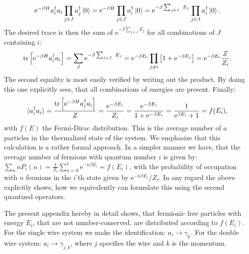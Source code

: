 \begin{equation}
\text{e}^{-\beta H} a^\dagger_i a_i\prod_{j\in J} a^\dagger_j \ket{0} = \text{e}^{-\beta H}\prod_{j\in J} a^\dagger_i \ket{0} = \text{e}^{-\beta \sum_{j \in J} E_j} \prod_{j \in J} a^\dagger_i \ket{0}. \nonumber
\end{equation}
The desired trace is then the sum of $\text{e}^{-\beta \sum_{j \in J} E_j}$ for all combinations of $J$ containing $i$:
\begin{equation}
\tr\left[\text{e}^{-\beta H}a^\dagger_ia_i\right] = \sum_J \text{e}^{-\beta \sum_{j \in J} E_j} = \text{e}^{-\beta E_i}\prod_{j \neq i} \left[1 + \text{e}^{-\beta E_j}\right] = \text{e}^{-\beta E_i} \frac{Z}{Z_i}. \nonumber 
\end{equation}
The second equality is most easily verified by writing out the product. By doing this one explicitly sees, that all combinations of energies are present. Finally: 
\begin{equation}
\braket{a^\dagger_ia_i} = \frac{\operatorname{tr}\left[\text{e}^{-\beta H}a^\dagger_ia_i\right]}{Z} = \frac{\text{e}^{-\beta E_i }}{Z_i} = \frac{\text{e}^{-\beta E_i}}{ 1 + \text{e}^{-\beta E_i} } = \frac{1}{ \text{e}^{\beta E_i} + 1 } = f(E_i),
\end{equation}
with $f(E)$ the Fermi-Dirac distribution. This is the average number of $a$ particles in the thermalized state of the system. We emphasize that this calculation is a rather formal approach. In a simpler manner we have, that the average number of fermions with quantum number $i$ is given by: $\sum_n n P_i(n) = \frac{1}{Z_i}\sum_{n = 0}^{1} \text{e}^{ -n\beta E_i } = f( E_i )$, with the probability of occupation with $n$ fermions in the $i$'th state given by $\text{e}^{-n\beta E_i}/Z_i$. In any regard the above explicitly shows, how we equivalently can formulate this using the second quantized operators. 

The present appendix hereby in detail shows, that fermionic free particles with energy $E_i$, that are not number-conserved, are distributed according to $f(E_i)$. For the single wire system we make the identification: $a_i \to \gamma_k$. For the double wire system: $a_i \to \gamma_{j,k}$, where $j$ specifies the wire and $k$ is the momentum. 
